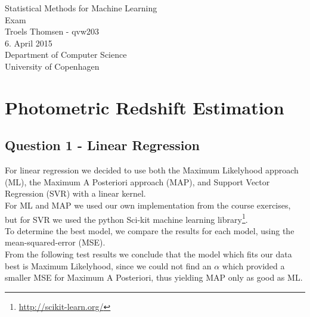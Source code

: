 \documentclass[12pt]{article}
\begin{document}
\begin{titlepage}
    \vspace*{\fill}
    \begin{center}
      {\Huge Statistical Methods for Machine Learning}\\[0.7cm]
      {\Large Exam}\\[0.4cm]
      {\large Troels Thomsen - qvw203}\\[0.4cm]
      {\small 6. April 2015}\\[0.3cm] 
      {\small Department of Computer Science}\\
      {\small University of Copenhagen}
    \end{center}
    \vspace*{\fill}
\end{titlepage}

\clearpage

\thispagestyle{empty}

\newpage

\tableofcontents

\thispagestyle{empty}

\newpage

\setcounter{page}{1}

\section{Photometric Redshift Estimation}

\subsection{Question 1 - Linear Regression}

For linear regression we decided to use both the Maximum Likelyhood approach (ML), the Maximum A Posteriori approach (MAP), and Support Vector Regression (SVR) with a linear kernel. \\
For ML and MAP we used our own implementation from the course exercises, but for SVR we used the python Sci-kit machine learning library\footnote{\url{http://scikit-learn.org/}}. \\

\noindent To determine the best model, we compare the results for each model, using the mean-squared-error (MSE).\\
From the following test results we conclude that the model which fits our data best is Maximum Likelyhood, since we could not find an $\alpha$ which provided a smaller MSE for Maximum A Posteriori, thus yielding MAP only as good as ML.
\end{document}
